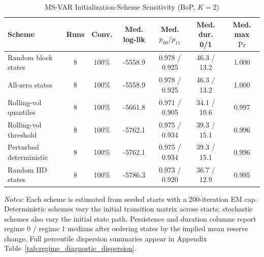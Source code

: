 \begin{table}[htbp]
\centering
\scriptsize
\caption{MS-VAR Initialization-Scheme Sensitivity (BoP, $K=2$)}
\label{tab:multistart}
\begin{tabular}{lcccccc}
\toprule
Scheme & Runs & Conv. & Med. log-lik & Med. $p_{00}/p_{11}$ & Med. dur. 0/1 & Med. max $\Pr$ \\
\midrule
Random block states & 8 & 100\% & -5558.9 & 0.978 / 0.925 & 46.3 / 13.2 & 1.000 \\
All-zero states & 8 & 100\% & -5558.9 & 0.978 / 0.925 & 46.3 / 13.2 & 1.000 \\
Rolling-vol quantiles & 8 & 100\% & -5661.8 & 0.971 / 0.905 & 34.1 / 10.6 & 0.997 \\
Rolling-vol threshold & 8 & 100\% & -5762.1 & 0.975 / 0.934 & 39.3 / 15.1 & 0.996 \\
Perturbed deterministic & 8 & 100\% & -5762.1 & 0.975 / 0.934 & 39.3 / 15.1 & 0.996 \\
Random IID states & 8 & 100\% & -5786.3 & 0.973 / 0.920 & 36.7 / 12.9 & 0.995 \\
\bottomrule
\end{tabular}
\begin{tablenotes}
\footnotesize
\item \textit{Notes:} Each scheme is estimated from seeded starts with a 200-iteration EM cap. Deterministic schemes vary the initial transition matrix across starts; stochastic schemes also vary the initial state path. Persistence and duration columns report regime 0 / regime 1 medians after ordering states by the implied mean reserve change. Full percentile dispersion summaries appear in Appendix Table~\ref{tab:regime_diagnostic_dispersion}.
\end{tablenotes}
\end{table}